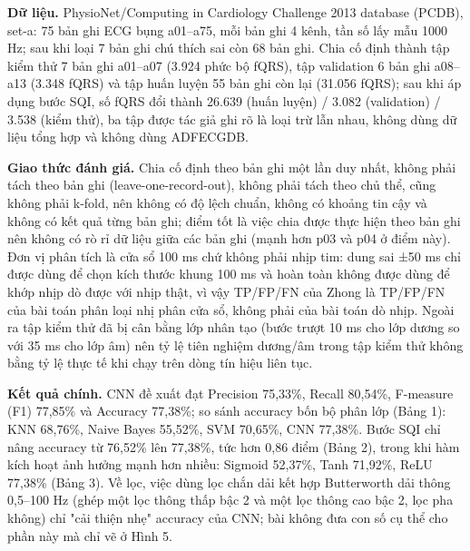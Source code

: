 \documentclass[12pt,a4paper]{article}
\begin{document}
\noindent \textbf{Dữ liệu.} PhysioNet/Computing in Cardiology Challenge 2013 database (PCDB), set-a: 75 bản ghi ECG bụng a01–a75, mỗi bản ghi 4 kênh, tần số lấy mẫu 1000 Hz; sau khi loại 7 bản ghi chú thích sai còn 68 bản ghi. Chia cố định thành tập kiểm thử 7 bản ghi a01–a07 (3.924 phức bộ fQRS), tập validation 6 bản ghi a08–a13 (3.348 fQRS) và tập huấn luyện 55 bản ghi còn lại (31.056 fQRS); sau khi áp dụng bước SQI, số fQRS đổi thành 26.639 (huấn luyện) / 3.082 (validation) / 3.538 (kiểm thử), ba tập được tác giả ghi rõ là loại trừ lẫn nhau, không dùng dữ liệu tổng hợp và không dùng ADFECGDB.\par\vspace{3pt}
\noindent \textbf{Giao thức đánh giá.} Chia cố định theo bản ghi một lần duy nhất, không phải tách theo bản ghi (leave-one-record-out), không phải tách theo chủ thể, cũng không phải k-fold, nên không có độ lệch chuẩn, không có khoảng tin cậy và không có kết quả từng bản ghi; điểm tốt là việc chia được thực hiện theo bản ghi nên không có rò rỉ dữ liệu giữa các bản ghi (mạnh hơn p03 và p04 ở điểm này). Đơn vị phân tích là cửa sổ 100 ms chứ không phải nhịp tim: dung sai ±50 ms chỉ được dùng để chọn kích thước khung 100 ms và hoàn toàn không được dùng để khớp nhịp dò được với nhịp thật, vì vậy TP/FP/FN của Zhong là TP/FP/FN của bài toán phân loại nhị phân cửa sổ, không phải của bài toán dò nhịp. Ngoài ra tập kiểm thử đã bị cân bằng lớp nhân tạo (bước trượt 10 ms cho lớp dương so với 35 ms cho lớp âm) nên tỷ lệ tiên nghiệm dương/âm trong tập kiểm thử không bằng tỷ lệ thực tế khi chạy trên dòng tín hiệu liên tục.\par\vspace{3pt}
\noindent \textbf{Kết quả chính.} CNN đề xuất đạt Precision 75,33\%, Recall 80,54\%, F-measure (F1) 77,85\% và Accuracy 77,38\%; so sánh accuracy bốn bộ phân lớp (Bảng 1): KNN 68,76\%, Naive Bayes 55,52\%, SVM 70,65\%, CNN 77,38\%. Bước SQI chỉ nâng accuracy từ 76,52\% lên 77,38\%, tức hơn 0,86 điểm (Bảng 2), trong khi hàm kích hoạt ảnh hưởng mạnh hơn nhiều: Sigmoid 52,37\%, Tanh 71,92\%, ReLU 77,38\% (Bảng 3). Về lọc, việc dùng lọc chắn dải kết hợp Butterworth dải thông 0,5–100 Hz (ghép một lọc thông thấp bậc 2 và một lọc thông cao bậc 2, lọc pha không) chỉ "cải thiện nhẹ" accuracy của CNN; bài không đưa con số cụ thể cho phần này mà chỉ vẽ ở Hình 5.\par\vspace{3pt}
\end{document}
